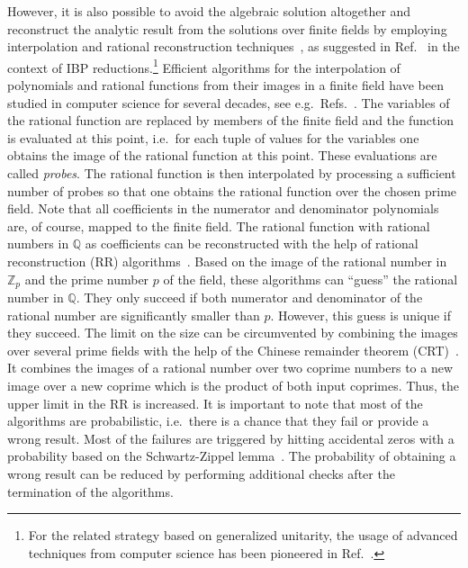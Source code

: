 \documentclass[11pt,a4paper,DIV=11,numbers=noenddot,parskip=half]{scrartcl}
\begin{document}
However, it is also possible to avoid the algebraic solution altogether and reconstruct the analytic result from the solutions over finite fields by employing interpolation and rational reconstruction techniques~\cite{deKleine:2005}, as suggested in Ref.~\cite{vonManteuffel:2014ixa} in the context of IBP reductions.\footnote{For the related strategy based on generalized unitarity, the usage of advanced techniques from computer science has been pioneered in Ref.~\cite{Peraro:2016wsq}.}
Efficient algorithms for the interpolation of polynomials and rational functions from their images in a finite field have been studied in computer science for several decades, see e.g.\ Refs.~\cite{Zippel:1979,Ben-Or:1988,Kaltofen:1988,Zippel:1990,Kaltofen:2000,Kaltofen:2003,deKleine:2005,Cuyt:2011}.
The variables of the rational function are replaced by members of the finite field and the function is evaluated at this point, i.e.\ for each tuple of values for the variables one obtains the image of the rational function at this point.
These evaluations are called \emph{probes}.
The rational function is then interpolated by processing a sufficient number of probes so that one obtains the rational function over the chosen prime field.
Note that all coefficients in the numerator and denominator polynomials are, of course, mapped to the finite field.
The rational function with rational numbers in $\mathbb{Q}$ as coefficients can be reconstructed with the help of rational reconstruction (RR) algorithms~\cite{Wang:1981,Monagan:2004}.
Based on the image of the rational number in $\mathbb{Z}_p$ and the prime number $p$ of the field, these algorithms can ``guess'' the rational number in $\mathbb{Q}$.
They only succeed if both numerator and denominator of the rational number are significantly smaller than $p$.
However, this guess is unique if they succeed.
The limit on the size can be circumvented by combining the images over several prime fields with the help of the Chinese remainder theorem (CRT)~\cite{von_zur_Gathen}.
It combines the images of a rational number over two coprime numbers to a new image over a new coprime which is the product of both input coprimes.
Thus, the upper limit in the RR is increased.
It is important to note that most of the algorithms are probabilistic, i.e.\ there is a chance that they fail or provide a wrong result.
Most of the failures are triggered by hitting accidental zeros with a probability based on the Schwartz-Zippel lemma~\cite{Zippel:1979,Schwartz:1980}.
The probability of obtaining a wrong result can be reduced by performing additional checks after the termination of the algorithms.
\end{document}
